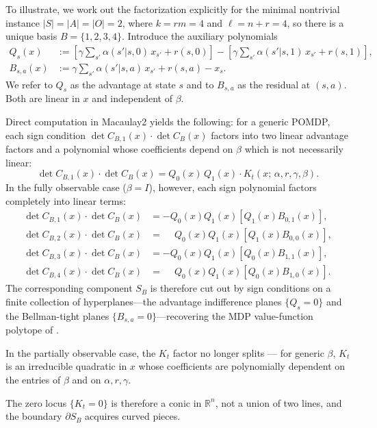 \documentclass{article}
\theoremstyle{definition}
\theoremstyle{remark}
\begin{document}
To illustrate, we work out the factorization explicitly for the minimal nontrivial instance $|S| = |A| = |O| = 2$, where $k = rm = 4$ and $\ell = n + r = 4$, so there is a unique basis $B = \{1,2,3,4\}$. Introduce the auxiliary polynomials
\begin{align*}
    Q_s(x) &:= \left[\gamma \sum_{s'} \alpha(s'|s,0)\, x_{s'} + r(s,0)\right] - \left[\gamma \sum_{s'} \alpha(s'|s,1)\, x_{s'} + r(s,1)\right], \\
    B_{s,a}(x) &:= \gamma \sum_{s'} \alpha(s'|s,a)\, x_{s'} + r(s,a) - x_s.
\end{align*}
We refer to $Q_s$ as the advantage at state $s$ and to $B_{s,a}$ as the residual at $(s,a)$. Both are linear in $x$ and independent of $\beta$.

Direct computation in Macaulay2 \citep{M2} yields the following: for a generic POMDP, each sign condition $\det C_{B,1}(x) \cdot \det C_B(x)$ factors into two linear advantage factors and a polynomial whose coefficients depend on $\beta$ which is not necessarily linear: 
$$
\det C_{B,1}(x) \cdot \det C_B(x) = Q_0(x)\, Q_1(x) \cdot K_t(x;\, \alpha, r, \gamma, \beta).
$$
In the fully observable case ($\beta = I$), however, each sign polynomial factors completely into linear terms:
\begin{align*}
    \det C_{B,1}(x) \cdot \det C_B(x) &= 
    -Q_0(x)Q_1(x)\left[Q_1(x) B_{0,1}(x)\right], \\
    \det C_{B,2}(x) \cdot \det C_B(x) &= \phantom{-}Q_0(x)Q_1(x)\left[Q_1(x)B_{0,0}(x)\right] , \\
    \det C_{B,3}(x) \cdot \det C_B(x) &= 
    -Q_0(x)Q_1(x)\left[Q_0(x)B_{1,1}(x)\right], \\
    \det C_{B,4}(x) \cdot \det C_B(x) &= \phantom{-}Q_0(x)Q_1(x)\left[Q_0(x)B_{1,0}(x)\right].
\end{align*}
The corresponding component $S_B$ is therefore cut out by sign conditions on a finite collection of hyperplanes---the advantage indifference planes $\{Q_s = 0\}$ and the Bellman-tight planes $\{B_{s,a} = 0\}$---recovering the MDP value-function polytope of \cite{dadashiValueFunctionPolytope2019}.

In the partially observable case, the $K_t$ factor no longer splits --- for generic $\beta$, $K_t$ is an irreducible quadratic in $x$ whose coefficients are polynomially dependent on the entries of $\beta$ and on $\alpha, r, \gamma$. 

The zero locus $\{K_t = 0\}$ is therefore a conic in $\mathbb{R}^n$, not a union of two lines, and the boundary $\partial S_B$ acquires curved pieces. 
\end{document}
